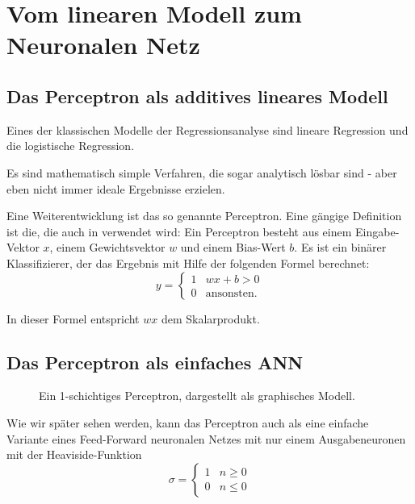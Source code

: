 ﻿\section{Vom linearen Modell zum Neuronalen Netz}

\subsection{Das Perceptron als additives lineares Modell}
Eines der klassischen Modelle der Regressionsanalyse sind lineare Regression und die logistische Regression. 

Es sind mathematisch simple Verfahren, die sogar analytisch lösbar sind - aber eben nicht immer ideale Ergebnisse erzielen.

Eine Weiterentwicklung ist das so genannte Perceptron.
Eine gängige Definition ist die, die auch in \cite{bishop1995neural} verwendet wird: 
Ein Perceptron besteht aus einem Eingabe-Vektor $x$, einem Gewichtsvektor $w$ und einem Bias-Wert $b$. Es ist ein binärer Klassifizierer, der das Ergebnis mit Hilfe der folgenden Formel berechnet:
\begin{equation}
\label{eq:perceptron}
    y = \begin{cases}
               1               & w x + b > 0\\
               0               & \text{ansonsten}. %
           \end{cases} 
\end{equation}

In dieser Formel entspricht $wx$ dem Skalarprodukt.

\subsection{Das Perceptron als einfaches ANN}
\begin{figure}[ht!]
  \centering
    
  \caption{Ein 1-schichtiges Perceptron, dargestellt als graphisches Modell.}
    \label{fig:SLP}
\end{figure}

Wie wir später sehen werden, kann das Perceptron auch als eine einfache Variante eines Feed-Forward neuronalen Netzes mit nur einem Ausgabeneuronen mit der Heaviside-Funktion
\begin{equation}
    \sigma = \begin{cases}
               1               & n \geq 0\\
               0               & n \leq 0
           \end{cases}
\end{equation}

